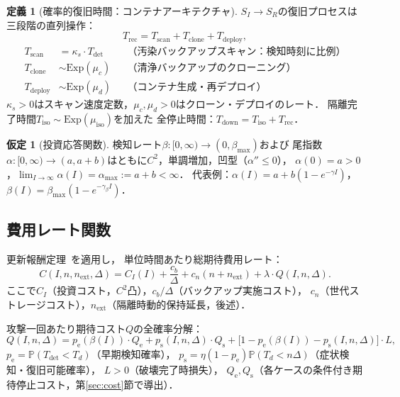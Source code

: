 \documentclass[12pt,a4paper]{article}
\theoremstyle{plain}
\theoremstyle{definition}
\newtheorem{definition}[theorem]{定義}
\newtheorem{assumption}[theorem]{仮定}
\theoremstyle{remark}
\newcommand{\Prob}{\mathbb{P}}
\newcommand{\pe}{p_{\mathrm{e}}}
\newcommand{\ps}{p_{\mathrm{s}}}
\newcommand{\Qe}{Q_{\mathrm{e}}}
\newcommand{\Qs}{Q_{\mathrm{s}}}
\newcommand{\Tdet}{T_{\mathrm{det}}}
\newcommand{\Trec}{T_{\mathrm{rec}}}
\newcommand{\Tdown}{T_{\mathrm{down}}}
\newcommand{\betaI}{\beta(I)}
\begin{document}
\begin{definition}[確率的復旧時間：コンテナアーキテクチャ]\label{def:recovery}
$S_I\to S_R$の復旧プロセスは三段階の直列操作：
\begin{equation}\label{eq:recovery_phases}
  \Trec = T_{\mathrm{scan}} + T_{\mathrm{clone}} + T_{\mathrm{deploy}},
\end{equation}
\begin{align*}
  T_{\mathrm{scan}} &= \kappa_s\cdot\Tdet
    && \text{（汚染バックアップスキャン：検知時刻に比例）}\\
  T_{\mathrm{clone}} &\sim \mathrm{Exp}(\mu_c)
    && \text{（清浄バックアップのクローニング）}\\
  T_{\mathrm{deploy}} &\sim \mathrm{Exp}(\mu_d)
    && \text{（コンテナ生成・再デプロイ）}
\end{align*}
$\kappa_s>0$はスキャン速度定数，$\mu_c,\mu_d>0$はクローン・デプロイのレート．
隔離完了時間$T_{\mathrm{iso}}\sim\mathrm{Exp}(\mu_{\mathrm{iso}})$を加えた
全停止時間：$\Tdown=T_{\mathrm{iso}}+\Trec$．
\end{definition}

\begin{assumption}[投資応答関数]\label{ass:alpha}
検知レート$\beta:[0,\infty)\to(0,\beta_{\max})$および
尾指数$\alpha:[0,\infty)\to(a,a+b)$はともに$C^2$，単調増加，凹型（$\alpha''\le0$），
$\alpha(0)=a>0$，$\lim_{I\to\infty}\alpha(I)=\alpha_{\max}:=a+b<\infty$．
代表例：$\alpha(I)=a+b(1-e^{-\gamma I})$，$\beta(I)=\beta_{\max}(1-e^{-\gamma_\beta I})$．
\end{assumption}

\subsection{費用レート関数}

更新報酬定理~\cite{ross2014}を適用し，
単位時間あたり総期待費用レート：
\begin{equation}\label{eq:cost_rate}
  C(I,n,n_{\mathrm{ext}},\Delta) = C_I(I) + \frac{c_b}{\Delta}
  + c_n(n+n_{\mathrm{ext}}) + \lambda\cdot Q(I,n,\Delta).
\end{equation}
ここで$C_I$（投資コスト，$C^2$凸），$c_b/\Delta$（バックアップ実施コスト），
$c_n$（世代ストレージコスト），$n_{\mathrm{ext}}$（隔離時動的保持延長，後述）．

攻撃一回あたり期待コスト$Q$の全確率分解：
\begin{equation}\label{eq:Q_decomp}
  Q(I,n,\Delta)
  = \pe(\betaI)\cdot\Qe
  + \ps(I,n,\Delta)\cdot\Qs
  + \bigl[1-\pe(\betaI)-\ps(I,n,\Delta)\bigr]\cdot L,
\end{equation}
$\pe=\Prob(\Tdet<T_d)$（早期検知確率），
$\ps=\eta(1-\pe)\Prob(T_d<n\Delta)$（症状検知・復旧可能確率），
$L>0$（破壊完了時損失），
$\Qe,\Qs$（各ケースの条件付き期待停止コスト，第\ref{sec:cost}節で導出）．
\end{document}
